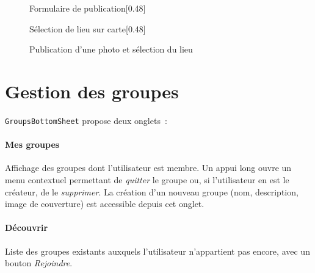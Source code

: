 \documentclass[12pt, a4paper]{report}
\begin{document}
\begin{figure}[H]
  \centering
  \begin{subcaptionbox}{Formulaire de publication\label{fig:publish_form}}[0.48\textwidth]
  \end{subcaptionbox}
  \hfill
  \begin{subcaptionbox}{Sélection de lieu sur carte\label{fig:map_picker}}[0.48\textwidth]
  \end{subcaptionbox}
  \caption{Publication d'une photo et sélection du lieu}
  \label{fig:publish}
\end{figure}

\section{Gestion des groupes}

\texttt{GroupsBottomSheet} propose deux onglets~:

\paragraph{Mes groupes}
Affichage des groupes dont l'utilisateur est membre. Un appui long ouvre un menu contextuel
permettant de \emph{quitter} le groupe ou, si l'utilisateur en est le créateur, de le
\emph{supprimer}. La création d'un nouveau groupe (nom, description, image de couverture)
est accessible depuis cet onglet.

\paragraph{Découvrir}
Liste des groupes existants auxquels l'utilisateur n'appartient pas encore, avec un bouton
\emph{Rejoindre}.
\end{document}
